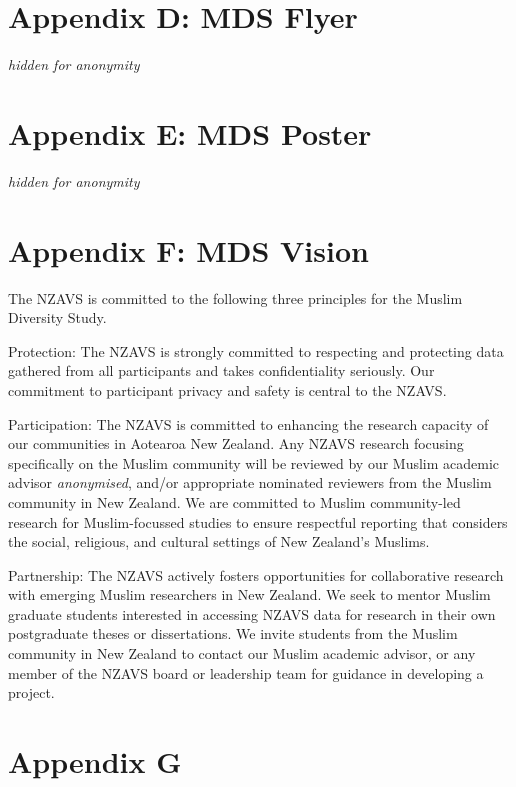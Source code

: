 \documentclass[
]{interact}
\begin{document}
\section{Appendix D: MDS Flyer}\label{appendix-d-mds-flyer}

\emph{hidden for anonymity}

\newpage{}

\section{Appendix E: MDS Poster}\label{appendix-e-mds-poster}

\emph{hidden for anonymity}

\newpage{}

\section{Appendix F: MDS Vision}\label{appendix-f-mds-vision}

The NZAVS is committed to the following three principles for the Muslim
Diversity Study.

\noindent Protection: The NZAVS is strongly committed to respecting and
protecting data gathered from all participants and takes confidentiality
seriously. Our commitment to participant privacy and safety is central
to the NZAVS.

\noindent Participation: The NZAVS is committed to enhancing the
research capacity of our communities in Aotearoa New Zealand. Any NZAVS
research focusing specifically on the Muslim community will be reviewed
by our Muslim academic advisor \emph{anonymised}, and/or appropriate
nominated reviewers from the Muslim community in New Zealand. We are
committed to Muslim community-led research for Muslim-focussed studies
to ensure respectful reporting that considers the social, religious, and
cultural settings of New Zealand's Muslims.

\noindent Partnership: The NZAVS actively fosters opportunities for
collaborative research with emerging Muslim researchers in New Zealand.
We seek to mentor Muslim graduate students interested in accessing NZAVS
data for research in their own postgraduate theses or dissertations. We
invite students from the Muslim community in New Zealand to contact our
Muslim academic advisor, or any member of the NZAVS board or leadership
team for guidance in developing a project.

\newpage{}

\section{Appendix G}\label{appendix-g}
\end{document}
